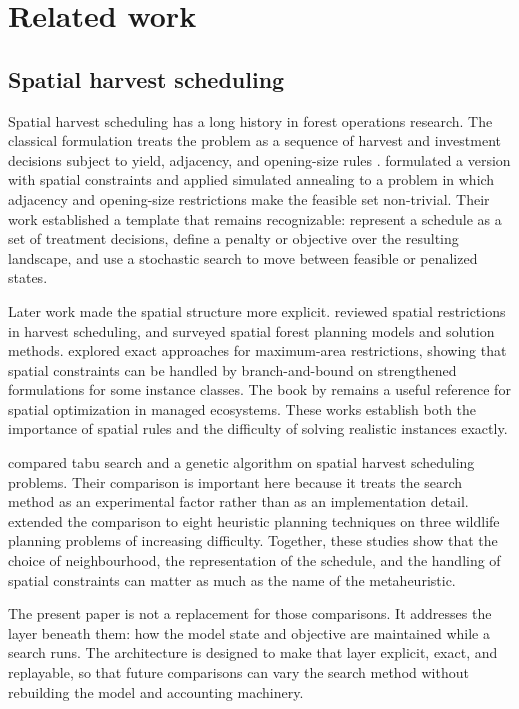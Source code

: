 \documentclass[11pt]{article}
\begin{document}
\section{Related work}\label{related-work}

\subsection{Spatial harvest scheduling}\label{spatial-harvest-scheduling}

Spatial harvest scheduling has a long history in forest operations research. The classical formulation
treats the problem as a sequence of harvest and investment decisions subject to yield, adjacency, and
opening-size rules \citep{johnson1977,davis2001}. \citet{lockwood1993} formulated a version with
spatial constraints and applied simulated annealing to a problem in which adjacency and opening-size
restrictions make the feasible set non-trivial. Their work established a template that remains
recognizable: represent a schedule as a set of treatment decisions, define a penalty or objective over
the resulting landscape, and use a stochastic search to move between feasible or penalized states.

Later work made the spatial structure more explicit. \citet{murray1999} reviewed spatial restrictions
in harvest scheduling, and \citet{baskent2005} surveyed spatial forest planning models and
solution methods. \citet{goycoolea2005} explored exact approaches for maximum-area restrictions,
showing that spatial constraints can be handled by branch-and-bound on strengthened formulations for
some instance classes. The book by \citet{hof1998} remains a useful reference for spatial
optimization in managed ecosystems. These works establish both the importance of spatial rules and the
difficulty of solving realistic instances exactly.

\citet{boston2002} compared tabu search and a genetic algorithm on spatial harvest scheduling
problems. Their comparison is important here because it treats the search method as an experimental
factor rather than as an implementation detail. \citet{bettinger2002} extended the comparison to
eight heuristic planning techniques on three wildlife planning problems of increasing difficulty.
Together, these studies show that the choice of neighbourhood, the representation of the schedule, and
the handling of spatial constraints can matter as much as the name of the metaheuristic.

The present paper is not a replacement for those comparisons. It addresses the layer beneath them: how
the model state and objective are maintained while a search runs. The architecture is designed to make
that layer explicit, exact, and replayable, so that future comparisons can vary the search method
without rebuilding the model and accounting machinery.
\end{document}
